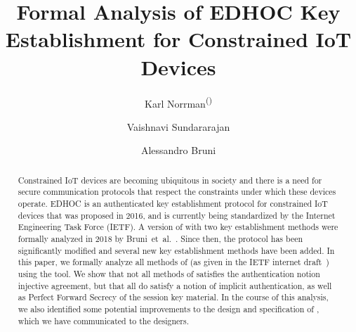 \documentclass[runningheads, envcountsame, hidelinks, a4paper, draft, x11names]{llncs}
\begin{document}
\title{Formal Analysis of EDHOC Key Establishment for Constrained IoT Devices}
\author{Karl Norrman\textsuperscript{(\Letter)}
\and
    Vaishnavi Sundararajan
\and
    Alessandro Bruni
}

%
%
\authorrunning{}
%
%
\maketitle
%

\begin{abstract}
Constrained IoT devices are becoming ubiquitous in society
and there is a need for secure communication protocols that respect the
constraints under which these devices operate.
%
EDHOC is an authenticated key establishment protocol for constrained IoT
devices that was proposed in 2016, and is currently being standardized by the
Internet Engineering Task Force (IETF).
%
A version of \mEdhoc{} with two key establishment methods were formally analyzed
in 2018 by Bruni~et~al.~\cite{DBLP:conf/secsr/BruniJPS18}.
%
Since then, the protocol has been significantly modified and several new key
establishment methods have been added.
%
In this paper, we formally analyze all methods of \mEdhoc{} (as given in
the IETF internet draft~\cite{our-analysis-selander-lake-edhoc-00}) using the
\mTamarin{} tool.
%
We show that not all methods of \mEdhoc{} satisfies the authentication notion
injective agreement, but that all do satisfy a notion of implicit
authentication, as well as Perfect Forward Secrecy of the session key material.
%
In the course of this analysis, we also identified some potential improvements to the
design and specification of \mEdhoc, which we have communicated to
the designers.
%
\end{abstract}
%

\end{document}
